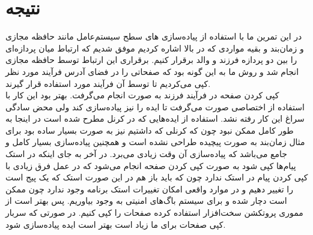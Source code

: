 \documentclass[a4paper, 12pt]{article}
\begin{document}
\section{نتیجه}
در این تمرین ما با استفاده از پیاده‌سازی های سطح سیستم‌عامل مانند حافظه مجازی و زمان‌بند و بقیه
مواردی که در بالا اشاره کردیم موفق شدیم که ارتباط میان‌ پردازه‌ای را بین دو پردازه فرزند و والد برقرار کنیم.
برقراری این ارتباط توسط حافظه مجازی انجام شد و روش ما به این گونه بود که صفحاتی را در فضای
آدرس فرآیند مورد نظر کپی می‌کردیم تا توسط آن فرآیند مورد استفاده قرار گیرند. \\
کپی کردن صفحه در فرآیند فرزند به صورت
انجام می‌گرفت. بهتر بود این کار با استفاده از
اختصاصی صورت می‌گرفت تا ایده
را نیز پیاده‌سازی کند ولی محض سادگی سراغ این کار رفته نشد.
استفاده از ایده‌هایی که در کرنل
مطرح شده است در اینجا به طور کامل ممکن نبود چون که کرنلی که داشتیم نیز به صورت
بسیار ساده بود برای مثال زمان‌بند به صورت پیچیده طراحی نشده است و همچنین پیاده‌سازی
بسیار کامل و جامع می‌باشد که پیاده‌سازی آن وقت زیادی می‌برد.
در آخر به جای اینکه در استک پیام‌ها کپی شود به صورت کپی کردن
صفحه انجام می‌شود که در عمل فرق زیادی با کپی کردن پیام در استک ندارد چون که باید
باز هم در این صورت استک که یک پیج است را تغییر دهیم و در موارد واقعی امکان تغییرات
استک برنامه وجود ندارد چون ممکن است دچار
شده و برای سیستم باگ‌های امنیتی به وجود بیاوریم.
پس بهتر است از مموری پروتکشن سخت‌افزار استفاده کرده صفحات را کپی کنیم.
در صورتی که سربار کپی صفحات برای ما زیاد است بهتر است ایده
پیاده‌سازی شود.
\end{document}
